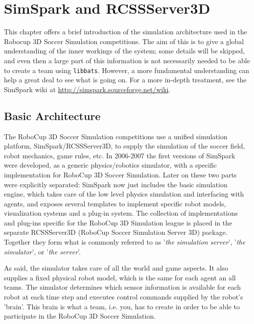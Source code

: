 
\chapter{SimSpark and RCSSServer3D}
\label{chSimspark}

This chapter offers a brief introduction of the simulation architecture used in the Robocup 3D Soccer Simulation competitions. The aim of this is to give a global understanding of the inner workings of the system; some details will be skipped, and even then a large part of this information is not necessarily needed to be able to create a team using {\tt libbats}. However, a more fundamental understanding can help a great deal to see what is going on. For a more in-depth treatment, see the SimSpark wiki at \url{http://simspark.sourceforge.net/wiki}.

\section{Basic Architecture}


The RoboCup 3D Soccer Simulation competitions use a unified simulation platform, SimSpark/RCSSServer3D, to supply the simulation of the soccer field, robot mechanics, game rules, etc. In 2006-2007 the first versions of SimSpark were developed, as a generic physics/robotics simulator, with a specific implementation for RoboCup 3D Soccer Simulation. Later on these two parts were explicitly separated: SimSpark now just includes the basic simulation engine, which takes care of the low level physics simulation and interfacing with agents, and exposes several templates to implement specific robot models, visualization systems and a plug-in system. The collection of implementations and plug-ins specific for the RoboCup 3D Simulation league is placed in the separate RCSSServer3D (RoboCup Soccer Simulation Server 3D) package. Together they form what is commonly referred to as '\emph{the simulation server}', '\emph{the simulator}', or '\emph{the server}'.

As said, the simulator takes care of all the world and game aspects. It also supplies a fixed physical robot model, which is the same for each agent an all teams. The simulator determines which sensor information is available for each robot at each time step and executes control commands supplied by the robot's 'brain'. This brain is what a team, i.e. you, has to create in order to be able to participate in the RoboCup 3D Soccer Simulation.

